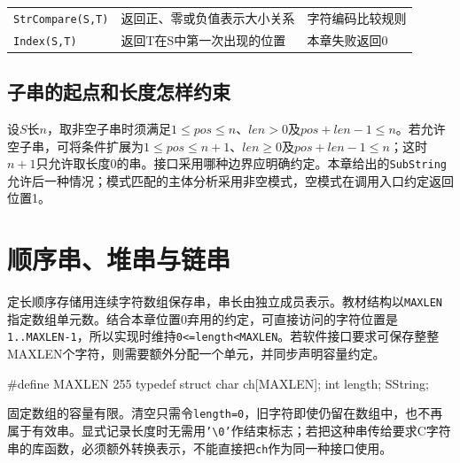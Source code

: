 \begin{wideblock}
\begin{minipage}{\linewidth}
\begin{tabularx}{\linewidth}{@{}YYY@{}}
\texttt{StrCompare(\allowbreak{}S,\allowbreak{}T)\allowbreak{}} & 返回正、零或负值表示大小关系 & 字符编码比较规则 \\
\texttt{Index(\allowbreak{}S,\allowbreak{}T)\allowbreak{}} & 返回T在S中第一次出现的位置 & 本章失败返回0 \\
\bottomrule\end{tabularx}
\end{minipage}\par\medskip

\end{wideblock}

\subsection{子串的起点和长度怎样约束}\label{DS04-bound}

设\(S\)长\(n\)，取非空子串时须满足\(1\le pos\le n\)、\(len>0\)及\(pos+len-1\le n\)。若允许空子串，可将条件扩展为\(1\le pos\le n+1\)、\(len\ge0\)及\(pos+len-1\le n\)；这时\(n+1\)只允许取长度0的串。接口采用哪种边界应明确约定。本章给出的\texttt{SubString}允许后一种情况；模式匹配的主体分析采用非空模式，空模式在调用入口约定返回位置1。

\section{顺序串、堆串与链串}\label{DS04-storage}

定长顺序存储用连续字符数组保存串，串长由独立成员表示。教材结构以\texttt{MAXLEN}指定数组单元数。结合本章位置0弃用的约定，可直接访问的字符位置是\texttt{1.\allowbreak{}.\allowbreak{}MAXLEN-1}，所以实现时维持\texttt{0<\allowbreak{}=\allowbreak{}length<\allowbreak{}MAXLEN}。若软件接口要求可保存整整MAXLEN个字符，则需要额外分配一个单元，并同步声明容量约定。

\par\medskip\noindent\begin{minipage}{\linewidth}
\begin{codeblock}[language=C++]
#define MAXLEN 255
typedef struct {
    char ch[MAXLEN];
    int length;
} SString;
\end{codeblock}
\end{minipage}\par\medskip

固定数组的容量有限。清空只需令\texttt{length=\allowbreak{}0}，旧字符即使仍留在数组中，也不再属于有效串。显式记录长度时无需用\texttt{'\textbackslash{}0'}作结束标志；若把这种串传给要求C字符串的库函数，必须额外转换表示，不能直接把\texttt{ch}作为同一种接口使用。

